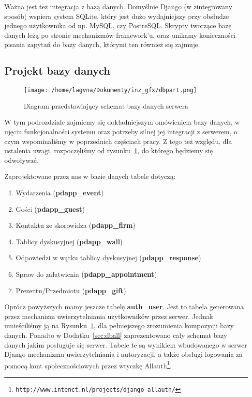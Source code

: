 \documentclass[12pt,titlepage]{article}
\begin{document}
Ważna jest też integracja z bazą danych. Domyślnie Django (w zintegrowany sposób) wspiera system SQLite, który jest dużo wydajniejszy przy obsłudze jednego użytkownika od np. MySQL, czy PostreSQL.
Skrypty tworzące bazę danych leżą po stronie mechanizmów framework'u, oraz unikamy konieczności pisania zapytań do bazy danych, którymi ten również się zajmuje.

\subsection{Projekt bazy danych}

\begin{figure}[htb]
\begin{center}
 \texttt{[image: /home/lagvna/Dokumenty/inz\_gfx/dbpart.png]}
 \caption{Diagram przedstawiający schemat bazy danych serwera}
 \label{fig:dbpart}
\end{center}
\end{figure}
\newpage
W tym podrozdziale zajmiemy się dokładniejszym omówieniem bazy danych, w ujęciu funkcjonalności systemu oraz potrzeby silnej jej integracji z serwerem, o czym wspominaliśmy w poprzednich częściach
pracy. Z tego też względu, dla ustalenia uwagi, rozpoczęliśmy od rysunku~\ref{fig:dbpart}, do którego będziemy się odwoływać.

Zaprojektowane przez nas w bazie danych tabele dotyczą:

\begin{enumerate}
 \item Wydarzenia (\textbf{pdapp\_event})
 \item Gości (\textbf{pdapp\_guest})
 \item Kontaktu ze skorowidza (\textbf{pdapp\_firm})
 \item Tablicy dyskusyjnej (\textbf{pdapp\_wall})
 \item Odpowiedzi w wątku tablicy dyskusyjnej (\textbf{pdapp\_response})
 \item Spraw do załatwienia (\textbf{pdapp\_appointment})
 \item Prezentu/Przedmiotu (\textbf{pdapp\_gift})
\end{enumerate}

Oprócz powyższych mamy jeszcze tabelę \textbf{auth\_user}. Jest to tabela generowana przez mechanizm uwierzytelniania użytkowników przez serwer. Jednak umieściliśmy ją na Rysunku~\ref{fig:dbpart}, 
dla pełniejszego zrozumienia kompozycji bazy danych.
Ponadto w Dodatku~\ref{sec:dball} zaprezentowano cały schemat bazy danych jakim posługuje się serwer. Tabele te są wynikiem wbudowanego w serwer Django mechanizmu uwierzytelniania i autoryzacji, a także
obsługi logowania za pomocą kont społecznościowych przez wtyczkę Allauth\footnote{\verb|http://www.intenct.nl/projects/django-allauth/|}.
\end{document}

